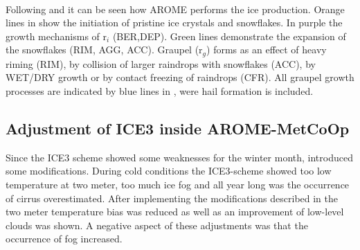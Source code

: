 \\
Following \cite{pinty_mixed-phased_1998} and  it can be seen how AROME performs the ice production. Orange lines in  show the initiation of pristine ice crystals and snowflakes. In purple the growth mechanisms of r$_i$ (BER,DEP). Green lines demonstrate the expansion of the snowflakes (RIM, AGG, ACC). Graupel (r$_g$) forms as an effect of heavy riming (RIM), by collision of larger raindrops with snowflakes (ACC), by WET/DRY growth or by contact freezing of raindrops (CFR). All graupel growth processes are indicated by blue lines in , were hail formation is included. 


%
\subsection{Adjustment of ICE3 inside AROME-MetCoOp}
Since the ICE3 scheme showed some weaknesses for the winter month, \cite{muller_arome-metcoop:_2017} introduced some modifications. 
During cold conditions the ICE3-scheme showed too low temperature at two meter, too much ice fog and all year long was the occurrence of cirrus overestimated. After implementing the modifications described in \cite{muller_arome-metcoop:_2017} the two meter temperature bias was reduced as well as an improvement of low-level clouds was shown. A negative aspect of these adjustments was that the occurrence of fog increased.%

